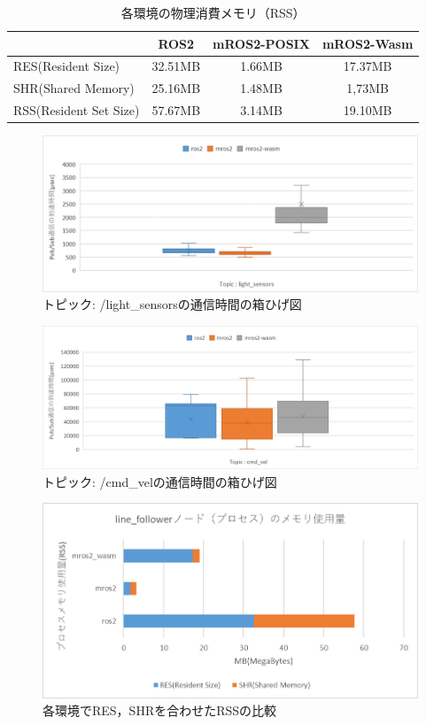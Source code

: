 \begin{table}[ht]
  \centering
  \begin{tabular}{|l|c|c|c|}
  \hline
   & ROS2 & mROS2-POSIX & mROS2-Wasm \\ \hline
  RES(Resident Size) & 32.51MB & 1.66MB & 17.37MB \\ \hline
  SHR(Shared Memory) & 25.16MB & 1.48MB & 1,73MB \\ \hline
  RSS(Resident Set Size) & 57.67MB & 3.14MB & 19.10MB \\ \hline
  \end{tabular}
  \caption{各環境の物理消費メモリ（RSS）}
  \label{tab:sensor_stats}
\end{table}

\begin{figure}[ht]
  \centering
  \includegraphics[width=15cm]{images/fig6_lightsensors.png}
  \caption{トピック: /light\_sensorsの通信時間の箱ひげ図}
  \label{fig:light_sensors}
\end{figure}
\begin{figure}[ht]
  \centering
  \includegraphics[width=15cm]{images/fig6_cmdvel.png}
  \caption{トピック: /cmd\_velの通信時間の箱ひげ図}
  \label{fig:cmd_vel}
\end{figure}
\begin{figure}[ht]
  \centering
  \includegraphics[width=15cm]{images/fig6_mros2-wasm_memory_v2.png}
  \caption{各環境でRES，SHRを合わせたRSSの比較}
  \label{fig:allmemory}
\end{figure}
